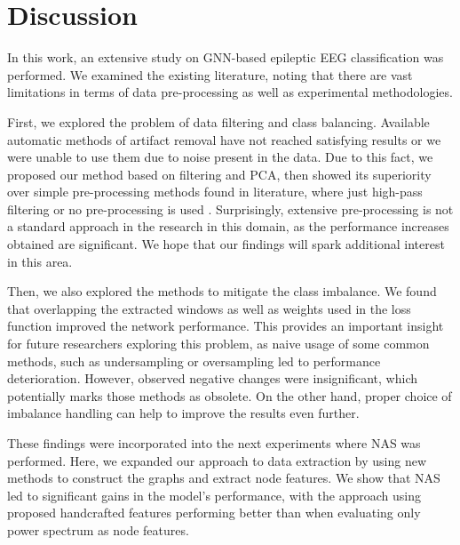 \documentclass[a4paper,fleqn]{cas-sc}
\begin{document}
\section{Discussion}
In this work, an extensive study on GNN-based epileptic EEG classification was performed. We examined the existing literature, noting that there are vast limitations in terms of data pre-processing as well as experimental methodologies.

First, we explored the problem of data filtering and class balancing. Available automatic methods of artifact removal have not reached satisfying results or we were unable to use them due to noise present in the data. Due to this fact, we proposed our method based on filtering and PCA, then showed its superiority over simple pre-processing methods found in literature, where just high-pass filtering \cite{JiaEfficientGraphConv, he2022gatblstm} or no pre-processing is used \cite{jibon2023gcndnn}. Surprisingly, extensive pre-processing is not a standard approach in the research in this domain, as the performance increases obtained are significant. We hope that our findings will spark additional interest in this area.

Then, we also explored the methods to mitigate the class imbalance. We found that overlapping the extracted windows as well as weights used in the loss function improved the network performance. This provides an important insight for future researchers exploring this problem, as naive usage of some common methods, such as undersampling or oversampling led to performance deterioration. However, observed negative changes were insignificant, which potentially marks those methods as obsolete. On the other hand, proper choice of imbalance handling can help to improve the results even further.

These findings were incorporated into the next experiments where NAS was performed. Here, we expanded our approach to data extraction by using new methods to construct the graphs and extract node features. We show that NAS led to significant gains in the model's performance, with the approach using proposed handcrafted features performing better than when evaluating only power spectrum as node features.
\end{document}
